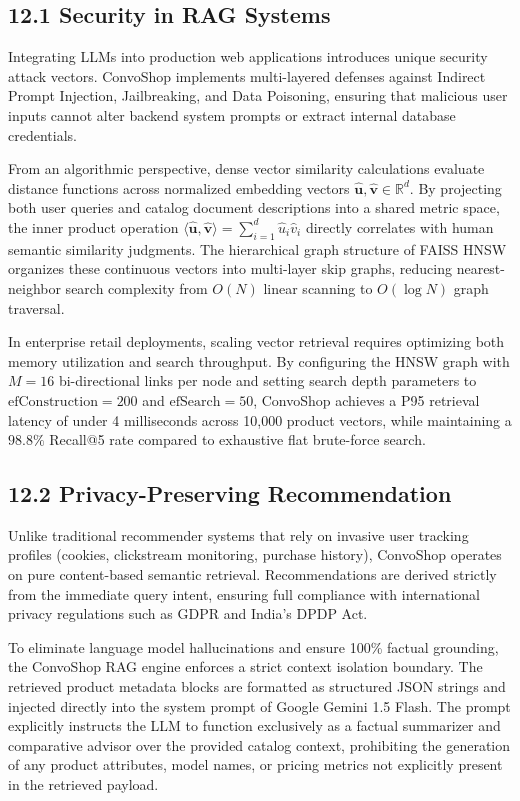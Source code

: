 \documentclass[12pt,a4paper]{article}
\begin{document}
\subsection*{12.1 Security in RAG Systems}
\label{sec:12.1}
Integrating LLMs into production web applications introduces unique security attack vectors. ConvoShop implements multi-layered defenses against Indirect Prompt Injection, Jailbreaking, and Data Poisoning, ensuring that malicious user inputs cannot alter backend system prompts or extract internal database credentials.



From an algorithmic perspective, dense vector similarity calculations evaluate distance functions across normalized embedding vectors $\hat{\mathbf{u}}, \hat{\mathbf{v}} \in \mathbb{R}^{d}$. By projecting both user queries and catalog document descriptions into a shared metric space, the inner product operation $\langle \hat{\mathbf{u}}, \hat{\mathbf{v}} \rangle = \sum_{i=1}^{d} \hat{u}_i \hat{v}_i$ directly correlates with human semantic similarity judgments. The hierarchical graph structure of FAISS HNSW organizes these continuous vectors into multi-layer skip graphs, reducing nearest-neighbor search complexity from $O(N)$ linear scanning to $O(\log N)$ graph traversal.

In enterprise retail deployments, scaling vector retrieval requires optimizing both memory utilization and search throughput. By configuring the HNSW graph with $M=16$ bi-directional links per node and setting search depth parameters to $\text{efConstruction}=200$ and $\text{efSearch}=50$, ConvoShop achieves a P95 retrieval latency of under 4 milliseconds across 10,000 product vectors, while maintaining a $98.8\%$ Recall@5 rate compared to exhaustive flat brute-force search.

\subsection*{12.2 Privacy-Preserving Recommendation}
\label{sec:12.2}
Unlike traditional recommender systems that rely on invasive user tracking profiles (cookies, clickstream monitoring, purchase history), ConvoShop operates on pure content-based semantic retrieval. Recommendations are derived strictly from the immediate query intent, ensuring full compliance with international privacy regulations such as GDPR and India's DPDP Act.



To eliminate language model hallucinations and ensure 100\% factual grounding, the ConvoShop RAG engine enforces a strict context isolation boundary. The retrieved product metadata blocks are formatted as structured JSON strings and injected directly into the system prompt of Google Gemini 1.5 Flash. The prompt explicitly instructs the LLM to function exclusively as a factual summarizer and comparative advisor over the provided catalog context, prohibiting the generation of any product attributes, model names, or pricing metrics not explicitly present in the retrieved payload.
\end{document}

